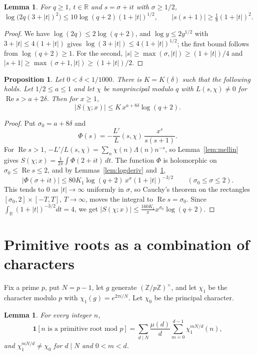 \documentclass[12pt]{amsart}
\newtheorem{lemma}[theorem]{Lemma}
\newtheorem{proposition}[theorem]{Proposition}
\theoremstyle{remark}
\renewcommand{\Re}{\operatorname{Re}}
\newcommand{\R}{\mathbb{R}}
\begin{document}
\begin{lemma}\label{lem:elementary}
For $q\ge1$, $t\in\R$ and $s=\sigma+it$ with $\sigma\ge1/2$,
\[
  \log\bigl(2q(3+|t|)^2\bigr)\le10\log(q+2)(1+|t|)^{1/2},\qquad |s(s+1)|\ge\tfrac18(1+|t|)^2.
\]
\end{lemma}

\begin{proof}
We have $\log(2q)\le2\log(q+2)$, and $\log y\le2y^{1/2}$ with $3+|t|\le4(1+|t|)$ gives
$\log(3+|t|)\le4(1+|t|)^{1/2}$; the first bound follows from $\log(q+2)\ge1$. For the second,
$|s|\ge\max(\sigma,|t|)\ge(1+|t|)/4$ and $|s+1|\ge\max(\sigma+1,|t|)\ge(1+|t|)/2$.
\end{proof}

\begin{proposition}\label{prop:riesz}
Let $0<\delta<1/1000$. There is $K=K(\delta)$ such that the following holds. Let $1/2\le a\le1$
and let $\chi$ be nonprincipal modulo $q$ with $L(s,\chi)\ne0$ for $\Re s>a+2\delta$. Then for
$x\ge1$,
\[
  |S(\chi;x)|\le K\,x^{a+8\delta}\log(q+2).
\]
\end{proposition}

\begin{proof}
Put $\sigma_0=a+8\delta$ and
\[
  \Phi(s)=-\frac{L'}{L}(s,\chi)\,\frac{x^s}{s(s+1)}.
\]
For $\Re s>1$, $-L'/L(s,\chi)=\sum_n\chi(n)\Lambda(n)n^{-s}$, so Lemma~\ref{lem:mellin} gives
$S(\chi;x)=\frac1{2\pi}\int\Phi(2+it)\,dt$. The function $\Phi$ is holomorphic on
$\sigma_0\le\Re s\le2$, and by Lemmas~\ref{lem:logderiv} and~\ref{lem:elementary},
\[
  |\Phi(\sigma+it)|\le80K_1\log(q+2)\,x^{\sigma}(1+|t|)^{-3/2}\qquad(\sigma_0\le\sigma\le2).
\]
This tends to $0$ as $|t|\to\infty$ uniformly in $\sigma$, so Cauchy's theorem on the rectangles
$[\sigma_0,2]\times[-T,T]$, $T\to\infty$, moves the integral to $\Re s=\sigma_0$. Since
$\int_\R(1+|t|)^{-3/2}dt=4$, we get $|S(\chi;x)|\le\frac{160K_1}{\pi}x^{\sigma_0}\log(q+2)$.
\end{proof}

\section{Primitive roots as a combination of characters}

Fix a prime $p$, put $N=p-1$, let $g$ generate $(\mathbb Z/p\mathbb Z)^\times$, and let $\chi_1$
be the character modulo $p$ with $\chi_1(g)=e^{2\pi i/N}$. Let $\chi_0$ be the principal character.

\begin{lemma}\label{lem:indicator}
For every integer $n$,
\[
  \mathbf 1[n\text{ is a primitive root mod }p]=\sum_{d\mid N}\frac{\mu(d)}d\sum_{m=0}^{d-1}
  \chi_1^{mN/d}(n),
\]
and $\chi_1^{mN/d}\ne\chi_0$ for $d\mid N$ and $0<m<d$.
\end{lemma}
\end{document}
